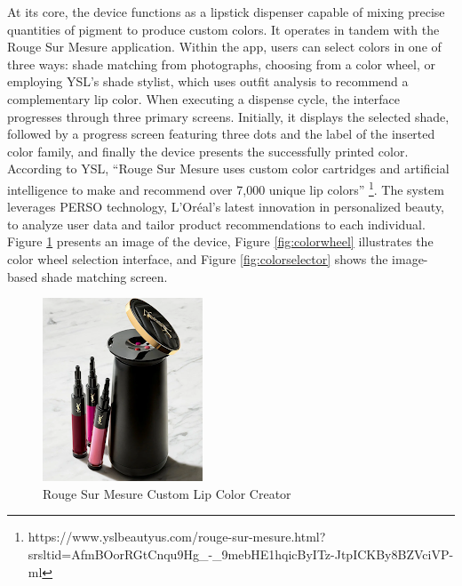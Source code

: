 At its core, the device functions as a lipstick dispenser capable of mixing precise quantities of pigment to produce custom colors. It operates in tandem with the Rouge Sur Mesure application. Within the app, users can select colors in one of three ways: shade matching from photographs, choosing from a color wheel, or employing YSL’s shade stylist, which uses outfit analysis to recommend a complementary lip color. When executing a dispense cycle, the interface progresses through three primary screens. Initially, it displays the selected shade, followed by a progress screen featuring three dots and the label of the inserted color family, and finally the device presents the successfully printed color. According to YSL, “Rouge Sur Mesure uses custom color cartridges and artificial intelligence to make and recommend over 7,000 unique lip colors” \footnote{ https://www.yslbeautyus.com/rouge-sur-mesure.html?srsltid=AfmBOorRGtCnqu9Hg\_-\_9mebHE1hqicByITz-JtpICKBy8BZVciVP-ml }. The system leverages PERSO technology, L’Oréal’s latest innovation in personalized beauty, to analyze user data and tailor product recommendations to each individual. Figure \ref{fig:makeupprinter} presents an image of the device, Figure \ref{fig:colorwheel} illustrates the color wheel selection interface, and Figure \ref{fig:colorselector} shows the image-based shade matching screen.
\begin{figure}[H]
	\centering
	\includegraphics[scale=1.1]{makeupprinter}
	\caption{Rouge Sur Mesure Custom Lip Color Creator}
	\label{fig:makeupprinter}
\end{figure}

